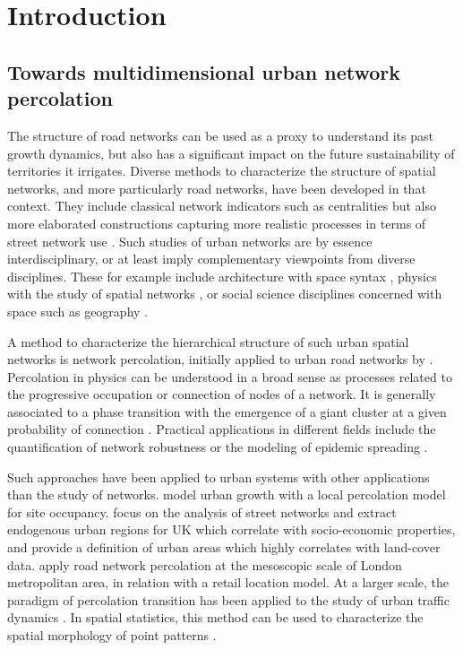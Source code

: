 \documentclass{jimis-en}
\begin{document}
\section{Introduction}

\strut
\vspace{-4ex}




\subsection{Towards multidimensional urban network percolation}

The structure of road networks can be used as a proxy to understand its past growth dynamics, but also has a significant impact on the future sustainability of territories it irrigates. Diverse methods to characterize the structure of spatial networks, and more particularly road networks, have been developed in that context. They include classical network indicators such as centralities \citep{crucitti2006centrality} but also more elaborated constructions capturing more realistic processes in terms of street network use \citep{lagesse2015spatial}. Such studies of urban networks are by essence interdisciplinary, or at least imply complementary viewpoints from diverse disciplines. These for example include architecture with space syntax \citep{hillier1976space}, physics with the study of spatial networks \citep{barthelemy2011spatial}, or social science disciplines concerned with space such as geography \citep{ducruet2014spatial}.


A method to characterize the hierarchical structure of such urban spatial networks is network percolation, initially applied to urban road networks by \cite{arcaute2016cities}. Percolation in physics can be understood in a broad sense as processes related to the progressive occupation or connection of nodes of a network. It is generally associated to a phase transition with the emergence of a giant cluster at a given probability of connection \citep{stauffer2014introduction}. Practical applications in different fields include the quantification of network robustness \citep{callaway2000network} or the modeling of epidemic spreading \citep{newman1999scaling}.

Such approaches have been applied to urban systems with other applications than the study of networks. \cite{makse1998modeling} model urban growth with a local percolation model for site occupancy. \cite{arcaute2016cities} focus on the analysis of street networks and extract endogenous urban regions for UK which correlate with socio-economic properties, and provide a definition of urban areas which highly correlates with land-cover data. \cite{piovani2017urban} apply road network percolation at the mesoscopic scale of London metropolitan area, in relation with a retail location model. At a larger scale, the paradigm of percolation transition has been applied to the study of urban traffic dynamics \citep{Li669,Zeng23}. In spatial statistics, this method can be used to characterize the spatial morphology of point patterns \citep{huynh2018characterisation}.
\end{document}
